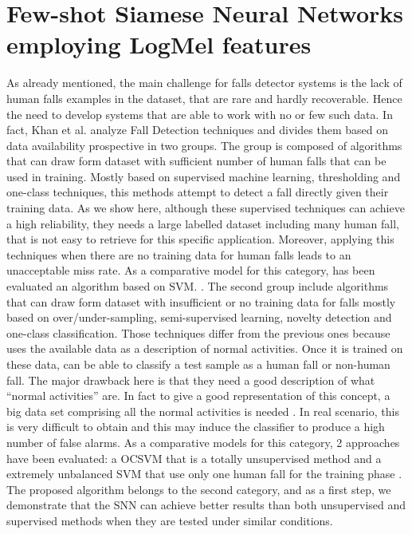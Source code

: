 \section{Few-shot Siamese Neural Networks employing LogMel features}
\label{sec:siamese_few_shot}
As already mentioned, the main challenge for falls detector systems is the lack of human falls examples in the dataset, that are rare and hardly recoverable. Hence the need to develop systems that are able to work with no or few such data. In fact, Khan et al. \cite{khan2017review} analyze Fall Detection techniques and divides them based on data availability prospective in two groups. The group is composed of algorithms that can draw form dataset with sufficient number of human falls that can be used in training. Mostly based on supervised machine learning, thresholding and one-class techniques, this methods attempt to detect a fall directly given their training data. As we show here, although these supervised techniques can achieve a high reliability, they needs a large labelled dataset including many human fall, that is not easy to retrieve for this specific application. Moreover, applying this techniques when there are no training data for human falls leads to an unacceptable miss rate. As a comparative model for this category, has been evaluated an algorithm based on SVM.%
. The second group include algorithms that can draw form dataset with insufficient or no training data for falls mostly based on over/under-sampling, semi-supervised learning, novelty detection and one-class classification. Those techniques differ from the previous ones because uses the available data as a description of normal activities. Once it is trained on these data, can be able to classify a test sample as a human fall or non-human fall. The major drawback here is that they need a good description of what ``normal activities'' are. In fact to give a good representation of this concept, a big data set comprising all the normal activities is needed \cite{pimentel2014review}. In real scenario, this is very difficult to obtain and this may induce the classifier to produce a high number of false alarms. As a comparative models for this category, 2 approaches have been evaluated: a OCSVM that is a totally unsupervised method and a extremely unbalanced SVM that use only one human fall for the training phase%
.
The proposed algorithm belongs to the second category, and as a first step, we demonstrate that the SNN can achieve better results than both unsupervised and supervised methods when they are tested under similar conditions.


